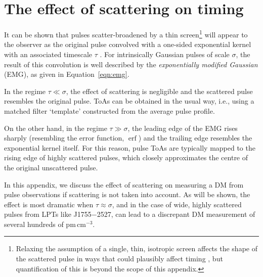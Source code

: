 \documentclass[fleqn,usenatbib]{mnras}
\newcommand{\src}{J1755$-$2527}
\DeclareMathOperator{\erf}{erf}
\newcommand{\Eqn}{Equation}
\begin{document}



\appendix

\section{The effect of scattering on timing}
\label{app:scattering_dm}

It can be shown that pulses scatter-broadened by a thin screen\footnote{Relaxing the assumption of a single, thin, isotropic screen affects the shape of the scattered pulse in ways that could plausibly affect timing \citep{2009MNRAS.395.1391R}, but quantification of this is beyond the scope of this appendix.} will appear to the observer as the original pulse convolved with a one-sided exponential kernel with an associated timescale $\tau$ \citep{1972MNRAS.157...55W,1973MNRAS.163..345W}.
For intrinsically Gaussian pulses of scale $\sigma$, the result of this convolution is well described by the \textit{exponentially modified Gaussian} (EMG), as given in \Eqn~\ref{eqn:emg}.

In the regime $\tau \ll \sigma$, the effect of scattering is negligible and the scattered pulse resembles the original pulse.
ToAs can be obtained in the usual way, i.e., using a matched filter `template' constructed from the average pulse profile.

On the other hand, in the regime $\tau \gg \sigma$, the leading edge of the EMG rises sharply (resembling the error function, $\erf$) and the trailing edge resembles the exponential kernel itself.
For this reason, pulse ToAs are typically mapped to the rising edge of highly scattered pulses, which closely approximates the centre of the original unscattered pulse.

In this appendix, we discuss the effect of scattering on measuring a DM from pulse observations if scattering is not taken into account.
As will be shown, the effect is most dramatic when $\tau \approx \sigma$, and in the case of wide, highly scattered pulses from LPTs like \src{}, can lead to a discrepant DM measurement of several hundreds of pm\,cm$^{-3}$.
\end{document}
